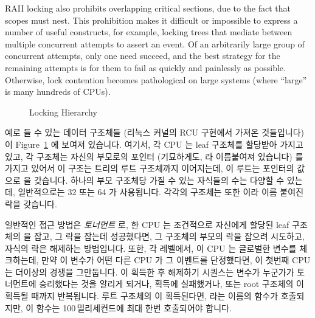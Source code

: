 RAII locking also prohibits overlapping critical sections, due to the fact
that scopes must nest.
This prohibition makes it difficult or impossible to express a number of
useful constructs, for example, locking trees
that mediate between multiple concurrent attempts to assert an event.
Of an arbitrarily large group of concurrent attempts, only one need succeed,
and the best strategy for the remaining attempts is for them to fail as
quickly and painlessly as possible.
Otherwise, lock contention becomes pathological on large systems
(where ``large'' is many hundreds of CPUs).
\fi

\begin{figure}[tb]
\centering
{}
\caption{Locking Hierarchy}
\label{fig:lock:Locking Hierarchy}
\end{figure}

예로 들 수 있는 데이터 구조체들 (리눅스 커널의 RCU 구현에서 가져온 것들입니다)
이 Figure~\ref{fig:lock:Locking Hierarchy} 에 보여져 있습니다.
여기서, 각 CPU 는 leaf  구조체를 할당받아 가지고 있고, 각
 구조체는 자신의 부모로의 포인터 (기묘하게도,  라
이름붙여져 있습니다) 를 가지고 있어서 이 구조는 트리의 루트 
구조체까지 이어지는데, 이 루트는  포인터의 값으로  을
갖습니다.
하나의 부모  구조체당 가질 수 있는 자식들의 수는 다양할 수 있는데,
일반적으로는 32 또는 64 가 사용됩니다.
각각의  구조체는 또한  이라 이름 붙여진 락을
갖습니다.

일반적인 접근 방법은 \emph{토너먼트} 로, 한 CPU 는 조건적으로 자신에게 할당된
leaf  구조체의  을 잡고, 그 락을 잡는데 성공했다면,
그 구조체의 부모의 락을 잡으려 시도하고, 자식의 락은 해제하는 방법입니다.
또한, 각 레벨에서, 이 CPU 는 글로벌한  변수를 체크하는데, 만약 이
변수가 어떤 다른 CPU 가 그 이벤트를 단정했다면, 이 첫번째 CPU 는 더이상의
경쟁을 그만둡니다.
이 획득한 후 해제하기 시퀀스는  변수가 누군가가 토너먼트에
승리했다는 것을 알리게 되거나,  획득에 실패했거나, 또는 root
 구조체의  이 획득될 때까지 반복됩니다.
루트  구조체의  이 획득된다면,
 라는 이름의 함수가 호출되지만, 이 함수는
100\,밀리세컨드에 최대 한번 호출되어야 합니다.
\iffalse

